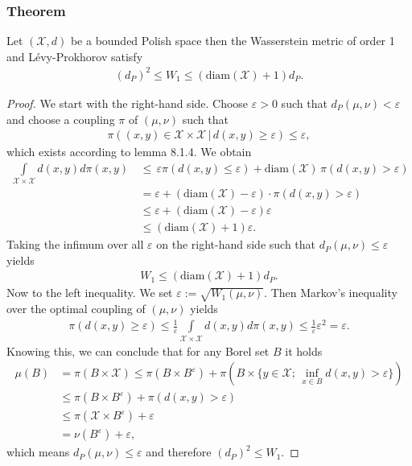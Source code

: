 \documentclass[11pt,a4paper]{article}
\begin{document}
\subsubsection{Theorem}
Let $(\mathcal{X},d)$ be a bounded Polish space then the Wasserstein metric of order 1 and Lévy-Prokhorov satisfy
\begin{align*}
(d_P)^2 \leq W_1 \leq (\text{diam}(\mathcal{X})+1)d_P.
\end{align*}
\begin{proof}
We start with the right-hand side. Choose $\varepsilon>0$ such that $d_P(\mu,\nu)<\varepsilon$ and choose a coupling $\pi$ of $(\mu,\nu)$ such that 
\begin{align*}
\pi\left((x,y)\in\mathcal{X\times{}X}\,|\,d(x,y)\geq\varepsilon\right)\leq\varepsilon,
\end{align*}
which exists according to lemma 8.1.4. We obtain\vspace{0.25em}\\
\begin{align*}
\int\limits_{\mathcal{X\times{}X}}d(x,y)d\pi(x,y)\, &\leq \,\varepsilon\pi\left(d(x,y)\leq\varepsilon\right) + \text{diam}(\mathcal{X})\,\pi\left(d(x,y)>\varepsilon\right) \\[-15pt]&= \varepsilon + (\text{diam}(\mathcal{X})-\varepsilon)\cdot\pi(d(x,y)>\varepsilon)\\&\leq\varepsilon + (\text{diam}(\mathcal{X})-\varepsilon)\varepsilon \\&\leq(\text{diam}(\mathcal{X})+1)\varepsilon.
\end{align*}
Taking the infimum over all $\varepsilon$ on the right-hand side such that $d_P(\mu,\nu)\leq\varepsilon$ yields
\begin{align*}
W_1\leq{}(\text{diam}(\mathcal{X})+1)d_P.
\end{align*}
Now to the left inequality. We set $\varepsilon{}:=\sqrt{W_1(\mu,\nu)}$. Then Markov's inequality over the optimal coupling of $(\mu,\nu)$ yields
\begin{align*}
\pi(d(x,y)\geq\varepsilon) \leq \frac{1}{\varepsilon}\int\limits_{\mathcal{X\times{}X}}d(x,y)d\pi(x,y)\leq\frac{1}{\varepsilon}\varepsilon^2=\varepsilon.
\end{align*}
Knowing this, we can conclude that for any Borel set $B$ it holds
\begin{align*}
\mu(B) &= \pi(B\times\mathcal{X}) \leq \pi(B\times{}B^{\varepsilon}) + \pi(B\times{}\lbrace{}y\in\mathcal{X};\,\inf\limits_{x\in{}B}d(x,y)>\varepsilon\rbrace) \\&\leq \pi(B\times{}B^{\varepsilon}) + \pi(d(x,y)>\varepsilon)\\[5pt]&\leq\pi(\mathcal{X}\times{}B^{\varepsilon})+\varepsilon \\[4pt]&= \nu(B^{\varepsilon})+\varepsilon,
\end{align*}
which means $d_P(\mu,\nu)\leq\varepsilon$ and therefore $(d_P)^2\leq{}W_1.$
\end{proof}
\end{document}
